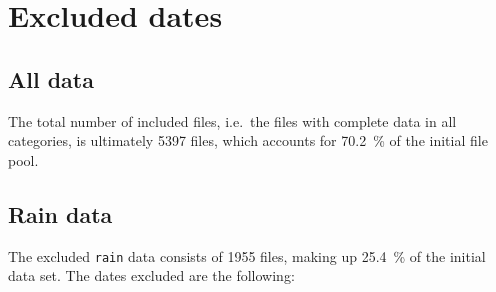 \documentclass[10pt]{article}\usepackage[]{graphicx}\usepackage[]{color}
\theoremstyle{plain}
\begin{document}
\printbibliography
\appendix
\section{Excluded dates}
\subsection{All data}

The total number of included files, i.e.\ the files with complete data in all categories, is ultimately 5397 files, which accounts for 70.2~\% of the initial file pool.

\subsection{Rain data}
The excluded \texttt{rain} data consists of 1955 files, making up 25.4~\% of the initial data set. The dates excluded are the following:
\end{document}
